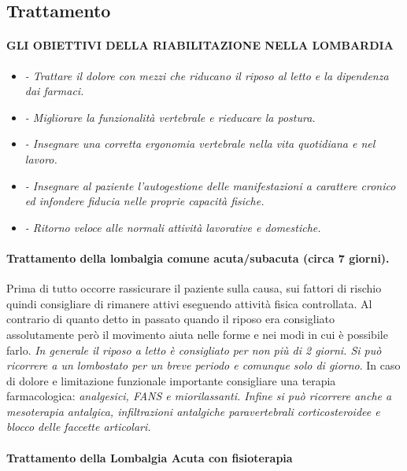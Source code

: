 \subsection{Trattamento}


\paragraph{GLI OBIETTIVI DELLA RIABILITAZIONE NELLA LOMBARDIA}

\begin{itemize}
\item 
\emph{- Trattare il dolore con mezzi che riducano il riposo al letto e
la dipendenza dai farmaci. }
\item 
\emph{- Migliorare la funzionalità vertebrale e rieducare la postura. }
\item 
\emph{- Insegnare una corretta ergonomia vertebrale nella vita
quotidiana e nel lavoro. }
\item 
\emph{- Insegnare al paziente l'autogestione delle manifestazioni a
carattere cronico ed infondere fiducia nelle proprie capacità fisiche. }
\item 
\emph{- Ritorno veloce alle normali attività lavorative e domestiche. }
\end{itemize}
\paragraph{Trattamento della lombalgia comune acuta/subacuta (circa
7 giorni). }

Prima di tutto occorre rassicurare il paziente sulla causa,
sui fattori di rischio quindi consigliare di rimanere attivi eseguendo
attività fisica controllata. Al contrario di quanto detto in passato
quando il riposo era consigliato assolutamente però il movimento aiuta
nelle forme e nei modi in cui è possibile farlo. \emph{In generale il
riposo a letto è consigliato per non più di 2 giorni. Si può ricorrere a
un lombostato per un breve periodo e comunque solo di giorno}. In caso
di dolore e limitazione funzionale importante consigliare una terapia
farmacologica: \emph{analgesici, FANS e miorilassanti. Infine si può
ricorrere anche a mesoterapia antalgica, infiltrazioni antalgiche
paravertebrali corticosteroidee e blocco delle faccette articolari.}
\\\\
\textbf{Trattamento della Lombalgia Acuta con fisioterapia }
 

